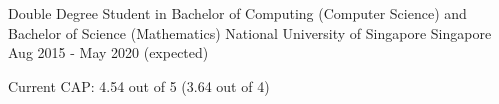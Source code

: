 

\begin{cventries}

  \cventry
  {Double Degree Student in Bachelor of Computing (Computer Science) and Bachelor of Science (Mathematics)} %
  {National University of Singapore} %
  {Singapore} %
  {Aug 2015 - May 2020 (expected)} %
  {
    \begin{cvitems} %
    \item {Current CAP: 4.54 out of 5 (3.64 out of 4)}
    \end{cvitems}
  }

\end{cventries}
